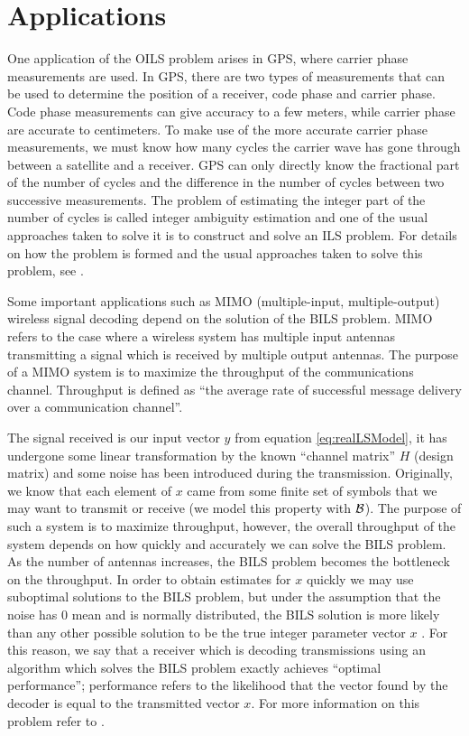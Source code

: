 \documentclass[12pt,Bold,letterpaper]{mcgilletdclass}
\newcommand{\boxcon}{{\cal B}}
\newcommand{\vsp}{\vspace{\baselineskip}}
\begin{document}
\vsp \section{Applications}
One application of the OILS problem arises in GPS, where carrier phase measurements are used. In GPS, there are two types of measurements that can be used to determine the position of a receiver, code phase and carrier phase. Code phase measurements can give accuracy to a few meters, while carrier phase are accurate to centimeters. To make use of the more accurate carrier phase measurements, we must know how many cycles the carrier wave has gone through between a satellite and a receiver. GPS can only directly know the fractional part of the number of cycles and the difference in the number of cycles between two successive measurements. The problem of estimating the integer part of the number of cycles is called integer ambiguity estimation and one of the usual approaches taken to solve it is to construct and solve an ILS problem. For details on how the problem is formed and the usual approaches taken to solve this problem, see \cite{Xu07}. 

Some important applications such as MIMO (multiple-input, multiple-output) wireless signal decoding depend on the
solution of the BILS problem. MIMO refers to the case where a wireless system has multiple
input antennas transmitting a signal which is received by multiple output
antennas. The purpose of a MIMO system is to maximize the throughput of the communications channel. Throughput is defined as ``the average rate of successful message delivery over a communication channel''. 

The signal received is our input vector $y$ from
equation \eqref{eq:realLSModel}, it has undergone some linear transformation by the known
``channel matrix'' $H$ (design matrix) and some noise has been introduced during
the transmission. Originally, we know that each element of $x$ came from some
finite set of symbols that we may want to transmit or receive (we model
this property with $\boxcon$). The purpose of such a system is to maximize
throughput, however, the overall throughput of the system depends on how
quickly and accurately we can solve the BILS problem. As the number of antennas increases, the BILS problem becomes the bottleneck on the throughput. In order to obtain estimates for $x$ quickly we may use suboptimal solutions to the BILS problem, but under the assumption that the noise has $0$ mean and is
normally distributed, the BILS solution is more likely than any other possible
solution to be the true integer parameter vector $x$ \cite{Han11}. For this reason, we say that a receiver which is decoding transmissions using an algorithm which solves the BILS problem exactly achieves ``optimal performance''; performance refers to the likelihood that the vector found by the decoder is equal to the transmitted vector $x$. For more information on this problem refer to \cite{Jan04}.
\end{document}
